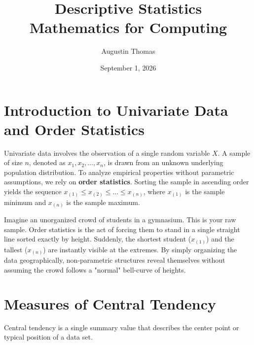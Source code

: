 \documentclass[11pt, a4paper]{article}
\title{\textbf{Descriptive Statistics}\\
\large Mathematics for Computing}
\author{Augustin Thomas}
\date{September 1, 2026}
\begin{document}
\maketitle
\vspace{-1.5cm}

\section{Introduction to Univariate Data and Order Statistics}
Univariate data involves the observation of a single random variable $X$. A sample of size $n$, denoted as $x_1, x_2, \dots, x_n$, is drawn from an unknown underlying population distribution. To analyze empirical properties without parametric assumptions, we rely on \textbf{order statistics}. Sorting the sample in ascending order yields the sequence $x_{(1)} \le x_{(2)} \le \dots \le x_{(n)}$, where $x_{(1)}$ is the sample minimum and $x_{(n)}$ is the sample maximum.

\begin{tcolorbox}[profbox, title=Imagine: The Roll Call]
Imagine an unorganized crowd of students in a gymnasium. This is your raw sample. Order statistics is the act of forcing them to stand in a single straight line sorted exactly by height. Suddenly, the shortest student ($x_{(1)}$) and the tallest ($x_{(n)}$) are instantly visible at the extremes. By simply organizing the data geographically, non-parametric structures reveal themselves without assuming the crowd follows a "normal" bell-curve of heights.
\end{tcolorbox}

\vspace{0.3cm}
\noindent{}
\vspace{0.3cm}

\section{Measures of Central Tendency}
Central tendency is a single summary value that describes the center point or typical position of a data set.
\end{document}
